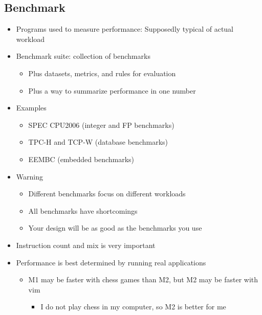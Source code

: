\documentclass[12pt]{article}
\begin{document}
        \subsection{Benchmark}
            \begin{itemize}
                \item {Programs used to measure performance: Supposedly typical of actual workload}
                \item {Benchmark suite: collection of benchmarks}
                    \begin{itemize}
                        \item {Plus datasets, metrics, and rules for evaluation}
                        \item {Plus a way to summarize performance in one number}
                    \end{itemize}
                \item {Examples}
                    \begin{itemize}
                        \item {SPEC CPU2006 (integer and FP benchmarks)}
                        \item {TPC-H and TCP-W (database benchmarks)}
                        \item {EEMBC (embedded benchmarks)}
                    \end{itemize}
                \item {Warning}
                    \begin{itemize}
                        \item {Different benchmarks focus on different workloads}
                        \item {All benchmarks have shortcomings}
                        \item {Your design will be as good as the benchmarks you use}
                    \end{itemize}
                \item {Instruction count and mix is very important}
                \item {Performance is best determined by running real applications}
                    \begin{itemize}
                        \item {M1 may be faster with chess games than M2, but M2 may be faster with vim}
                            \begin{itemize}
                                \item {I do not play chess in my computer, so M2 is better for me}

\end{itemize}
\end{itemize}
\end{itemize}
\end{document}
